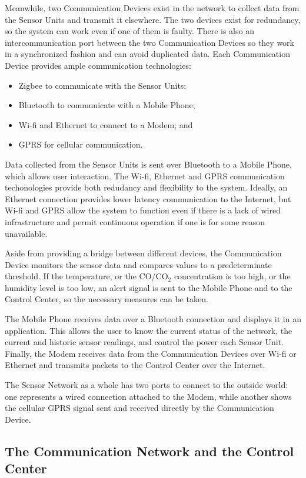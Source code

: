 Meanwhile, two Communication Devices exist in the network to collect data from the Sensor Units and transmit it elsewhere. The two devices exist for redundancy, so the system can work even if one of them is faulty. There is also an intercommunication port between the two Communication Devices so they work in a synchronized fashion and can avoid duplicated data. Each Communication Device provides ample communication technologies: 
\begin{itemize}
	\item Zigbee to communicate with the Sensor Units;
	\item Bluetooth to communicate with a Mobile Phone;
	\item Wi-fi and Ethernet to connect to a Modem; and
	\item GPRS for cellular communication.
\end{itemize}

Data collected from the Sensor Units is sent over Bluetooth to a Mobile Phone, which allows user interaction. The Wi-fi, Ethernet and GPRS communication techonologies provide both redudancy and flexibility to the system. Ideally, an Ethernet connection provides lower latency communication to the Internet, but Wi-fi and GPRS allow the system to function even if there is a lack of wired infrastructure and permit continuous operation if one is for some reason unavailable.

Aside from providing a bridge between different devices, the Communication Device monitors the sensor data and compares values to a predeterminate threshold. If the temperature, or the CO/CO$_2$ concentration is too high, or the humidity level is too low, an alert signal is sent to the Mobile Phone and to the Control Center, so the necessary measures can be taken.

The Mobile Phone receives data over a Bluetooth connection and displays it in an application. This allows the user to know the current status of the network, the current and historic sensor readings, and control the power each Sensor Unit. Finally, the Modem receives data from the Communication Devices over Wi-fi or Ethernet and transmits packets to the Control Center over the Internet.

The Sensor Network as a whole has two ports to connect to the outside world: one represents a wired connection attached to the Modem, while another shows the cellular GPRS signal sent and received directly by the Communication Device.

\subsection{The Communication Network and the Control Center}

